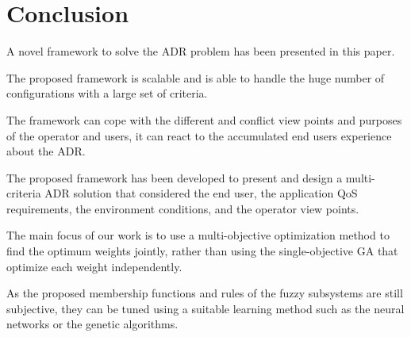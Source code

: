\section{Conclusion} \label{sec:Conclusion}



A novel framework to solve the \ac{ADR} problem has been presented in this paper.

The proposed framework is scalable and is able to handle the huge number of configurations with a large set of criteria.

The framework can cope with the different and conflict view points and purposes of the operator and users,
  it can react to the accumulated end users experience about the \ac{ADR}.



The proposed framework has been developed to present and design a multi-criteria \ac{ADR} solution that considered the end user,
	the application QoS requirements,
  the environment conditions,
	and the operator view points.


The main focus of our work is to use a multi-objective optimization method to find the optimum weights jointly,
  rather than using the single-objective GA that optimize each weight independently.

As the proposed membership functions and rules of the fuzzy subsystems are still subjective,
	they can be tuned using a suitable learning method such as the neural networks or the genetic algorithms.














